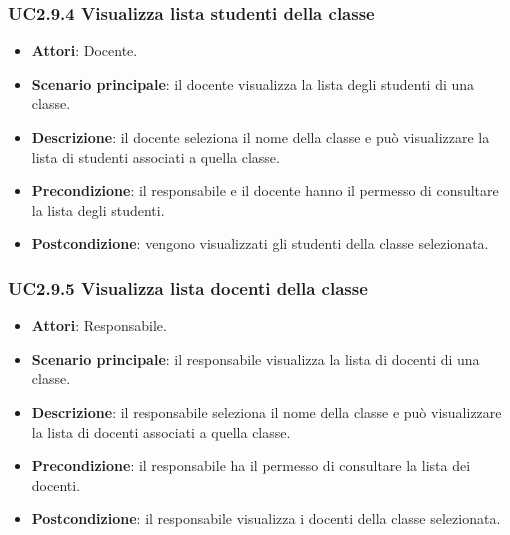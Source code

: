 \subsubsection{UC2.9.4 Visualizza lista studenti della classe}
\begin{itemize}
\item \textbf{Attori}: Docente.
\item \textbf{Scenario principale}: il docente visualizza la lista degli studenti di una classe.
\item \textbf{Descrizione}: il docente seleziona il nome della classe e può visualizzare la lista di studenti associati a quella classe.
\item \textbf{Precondizione}: il responsabile e il docente hanno il permesso di consultare la lista degli studenti.
\item \textbf{Postcondizione}: vengono visualizzati gli studenti della classe selezionata.
\end{itemize}
\subsubsection{UC2.9.5 Visualizza lista docenti della classe}
\begin{itemize}
\item \textbf{Attori}: Responsabile.
\item \textbf{Scenario principale}: il responsabile visualizza la lista di docenti di una classe.
\item \textbf{Descrizione}: il responsabile seleziona il nome della classe e può visualizzare la lista di docenti associati a quella classe.
\item \textbf{Precondizione}: il responsabile ha il permesso di consultare la lista dei docenti.
\item \textbf{Postcondizione}: il responsabile visualizza i docenti della classe selezionata.
\end{itemize}
